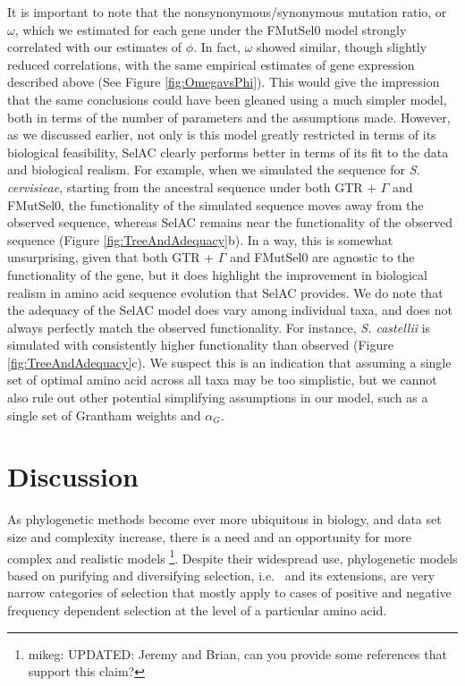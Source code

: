 \documentclass{article}
\newcommand{\selac}{SelAC\xspace}
\newcommand{\alphag}{\ensuremath{\alpha_G}\xspace}
\begin{document}
It is important to note that the nonsynonymous/synonymous mutation ratio, or $\omega$, which we estimated for each gene under the FMutSel0 model strongly correlated with our estimates of $\phi$.
In fact, $\omega$ showed similar, though slightly reduced correlations, with the same empirical estimates of gene expression described above (See Figure \ref{fig:OmegavsPhi}).
This would give the impression that the same conclusions could have been gleaned using a much simpler model, both in terms of the number of parameters and the assumptions made.
However, as we discussed earlier, not only is this model greatly restricted in terms of its biological feasibility, \selac clearly performs better in terms of its fit to the data and biological realism.
For example, when we simulated the sequence for \emph{S. cervisieae}, starting from the ancestral sequence under both GTR + $\Gamma$ and FMutSel0, the functionality of the simulated sequence moves away from the observed sequence, whereas SelAC remains near the functionality of the observed sequence (Figure \ref{fig:TreeAndAdequacy}b).
In a way, this is somewhat unsurprising, given that both GTR + $\Gamma$ and FMutSel0 are agnostic to the functionality of the gene, but it does highlight the improvement in biological realism in amino acid sequence evolution that \selac provides.
We do note that the adequacy of the SelAC model does vary among individual taxa, and does not always perfectly match the observed functionality.
For instance, \emph{S. castellii} is simulated with consistently higher functionality than observed (Figure \ref{fig:TreeAndAdequacy}c).
We suspect this is an indication that assuming a single set of optimal amino acid across all taxa may be too simplistic, but we cannot also rule out other potential simplifying assumptions in our model, such as a single set of Grantham weights and $\alphag$.




\section*{Discussion}
As phylogenetic methods become ever more ubiquitous in biology, and data set size and complexity increase, there is a need and an opportunity for more complex and realistic models \citep{GoldmanEtAl1996,ThorneEtAl1996,GoldmanEtAl1998,HalpernAndBruno1998,LartillotAndPhilippe2004} %
  \footnote{mikeg: UPDATED: Jeremy and Brian, can you provide some references that support this claim?}.
Despite their widespread use, phylogenetic models based on purifying and diversifying selection, i.e.~\citet{GoldmanAndYang1994} and its extensions, are very narrow categories of selection that mostly apply to cases of positive and negative frequency dependent selection at the level of a particular amino acid.
\end{document}
